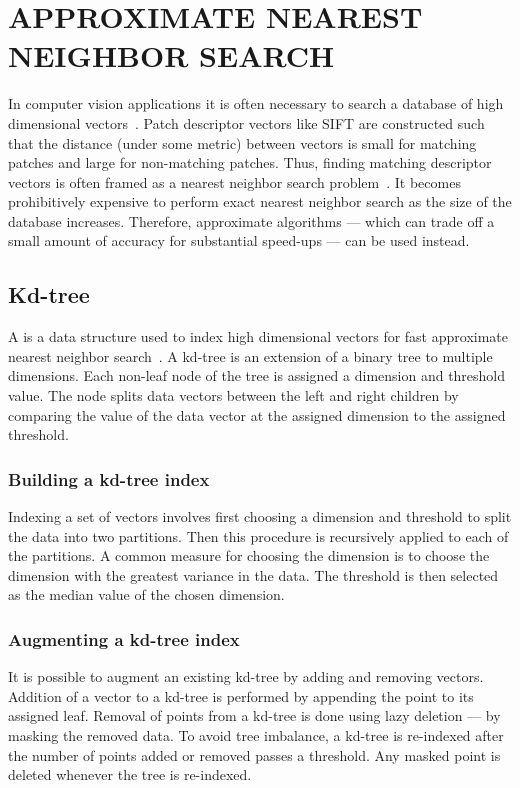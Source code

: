 \section{APPROXIMATE NEAREST NEIGHBOR SEARCH}\label{sec:ann}  

    In computer vision applications it is often necessary to search a database of high dimensional
    vectors~\cite{shakhnarovich_nearest_neighbor_2006, datar_locality_sensitive_2004, muja_fast_2009,
    kulis_kernelized_2012, weiss_spectral_2009}. Patch descriptor vectors like SIFT are constructed such that the
    distance (under some metric) between vectors is small for matching patches and large for non-matching patches.
    Thus, finding matching descriptor vectors is often framed as a nearest neighbor search
    problem~\cite{lowe_distinctive_2004}. It becomes prohibitively expensive to perform exact nearest neighbor
    search as the size of the database increases. Therefore, approximate algorithms --- which can trade off a small
    amount of accuracy for substantial speed-ups --- can be used instead.

    \subsection{Kd-tree}

        A  is a data structure used to index high dimensional vectors for fast approximate
        nearest neighbor search~\cite{bentley_multidimensional_1975}. A kd-tree is an extension of a binary tree to
        multiple dimensions. Each non-leaf node of the tree is assigned a dimension and threshold value. The node
        splits data vectors between the left and right children by comparing the value of the data vector at the
        assigned dimension to the assigned threshold.

        \subsubsection{Building a kd-tree index}
        Indexing a set of vectors involves first choosing a dimension and threshold to split the data into two
        partitions. Then this procedure is recursively applied to each of the partitions. A common measure for
        choosing the dimension is to choose the dimension with the greatest variance in the data. The threshold is
        then selected as the median value of the chosen dimension.

        \subsubsection{Augmenting a kd-tree index}
        It is possible to augment an existing kd-tree by adding and removing vectors. Addition of a vector to a
        kd-tree is performed by appending the point to its assigned leaf. Removal of points from a kd-tree is done
        using lazy deletion --- \ie{} by masking the removed data. To avoid tree imbalance, a kd-tree is re-indexed
        after the number of points added or removed passes a threshold. Any masked point is deleted whenever the
        tree is re-indexed.

